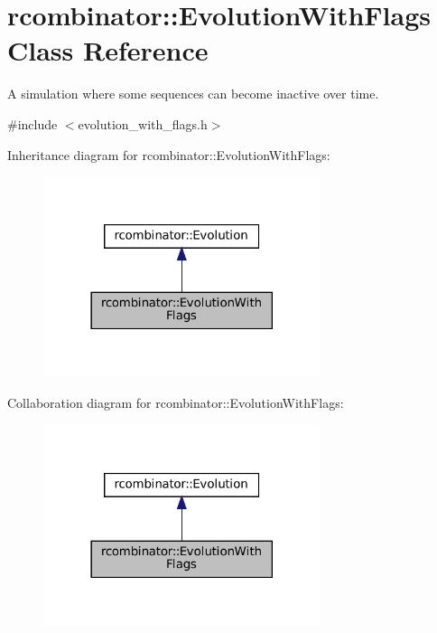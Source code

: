 \hypertarget{classrcombinator_1_1EvolutionWithFlags}{}\section{rcombinator\+:\+:Evolution\+With\+Flags Class Reference}
\label{classrcombinator_1_1EvolutionWithFlags}


A simulation where some sequences can become inactive over time.  




{\ttfamily \#include $<$evolution\+\_\+with\+\_\+flags.\+h$>$}



Inheritance diagram for rcombinator\+:\+:Evolution\+With\+Flags\+:
\nopagebreak
\begin{figure}[H]
\begin{center}
\leavevmode
\includegraphics[width=230pt]{classrcombinator_1_1EvolutionWithFlags__inherit__graph}
\end{center}
\end{figure}


Collaboration diagram for rcombinator\+:\+:Evolution\+With\+Flags\+:
\nopagebreak
\begin{figure}[H]
\begin{center}
\leavevmode
\includegraphics[width=230pt]{classrcombinator_1_1EvolutionWithFlags__coll__graph}
\end{center}
\end{figure}
